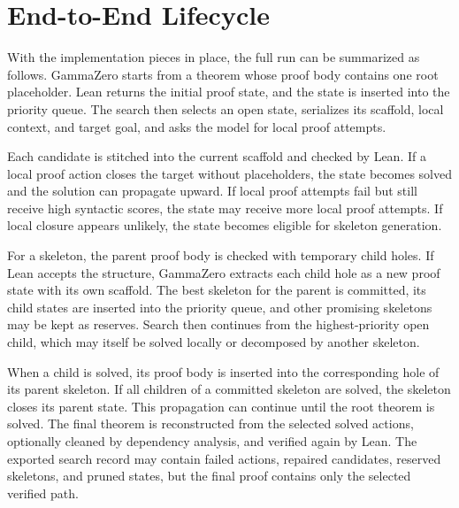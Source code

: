 \section{End-to-End Lifecycle}

With the implementation pieces in place, the full run can be summarized as follows. GammaZero starts
from a theorem whose proof body contains one root placeholder. Lean returns the initial proof state, and
the state is inserted into the priority queue. The search then selects an open state, serializes its scaffold,
local context, and target goal, and asks the model for local proof attempts.

Each candidate is stitched into the current scaffold and checked by Lean. If a local proof action closes
the target without placeholders, the state becomes solved and the solution can propagate upward. If local
proof attempts fail but still receive high syntactic scores, the state may receive more local proof
attempts. If local closure appears unlikely, the state becomes eligible for skeleton generation.

For a skeleton, the parent proof body is checked with temporary child holes. If Lean accepts the
structure, GammaZero extracts each child hole as a new proof state with its own scaffold. The best
skeleton for the parent is committed, its child states are inserted into the priority queue, and other
promising skeletons may be kept as reserves. Search then continues from the highest-priority open child,
which may itself be solved locally or decomposed by another skeleton.

When a child is solved, its proof body is inserted into the corresponding hole of its parent skeleton. If
all children of a committed skeleton are solved, the skeleton closes its parent state. This propagation can
continue until the root theorem is solved. The final theorem is reconstructed from the selected solved
actions, optionally cleaned by dependency analysis, and verified again by Lean. The exported search
record may contain failed actions, repaired candidates, reserved skeletons, and pruned states, but the
final proof contains only the selected verified path.
